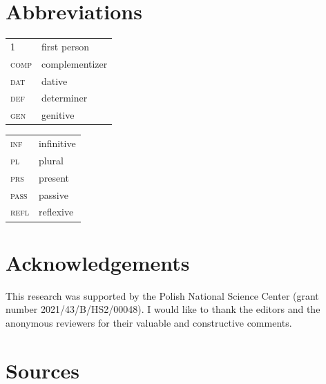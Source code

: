 \documentclass[output=paper,colorlinks,citecolor=brown]{langscibook}
\begin{document}
\largerpage[1]

\section*{Abbreviations}
\begin{tabularx}{.5\textwidth}{@{}lQ@{}}
\textsc{1} & first person \\
\textsc{comp} & complementizer \\
\textsc{dat} & dative \\
\textsc{def} & determiner \\
\textsc{gen} & genitive \\
\end{tabularx}%
\begin{tabularx}{.5\textwidth}{@{}lQ@{}}
\textsc{inf} & infinitive \\
\textsc{pl} & plural \\
\textsc{prs} & present \\
\textsc{pass} & passive \\
\textsc{refl} & reflexive \\
\end{tabularx}


\section*{Acknowledgements}
This research was supported by the Polish National Science Center (grant number 2021/43/B/HS2/00048). I would like to thank the editors and the anonymous reviewers for their valuable and constructive comments.


\section*{Sources}
\end{document}
